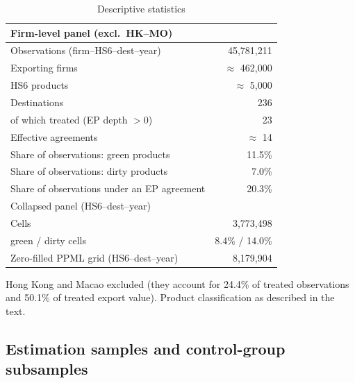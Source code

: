 \documentclass[12pt]{article}
\begin{document}
\begin{table}[htbp]
\centering
\caption{Descriptive statistics}
\label{tab:descriptives}
\small
\begin{threeparttable}
\begin{tabular}{lr}
\toprule
Firm-level panel (excl.\ HK--MO) & \\
\midrule
Observations (firm--HS6--dest--year) & 45{,}781{,}211 \\
Exporting firms & $\approx$ 462{,}000 \\
HS6 products & $\approx$ 5{,}000 \\
Destinations & 236 \\
\quad of which treated (EP depth $>0$) & 23 \\
Effective agreements & $\approx$ 14 \\
Share of observations: green products & 11.5\% \\
Share of observations: dirty products & 7.0\% \\
Share of observations under an EP agreement & 20.3\% \\
\midrule
Collapsed panel (HS6--dest--year) & \\
\midrule
Cells & 3{,}773{,}498 \\
\quad green / dirty cells & 8.4\% / 14.0\% \\
Zero-filled PPML grid (HS6--dest--year) & 8{,}179{,}904 \\
\bottomrule
\end{tabular}
\begin{tablenotes}\footnotesize
\item Hong Kong and Macao excluded (they account for 24.4\% of treated observations and
50.1\% of treated export value). Product classification as described in the text.
\end{tablenotes}
\end{threeparttable}
\end{table}

\subsection{Estimation samples and control-group subsamples}\label{sec:samples}
\end{document}
